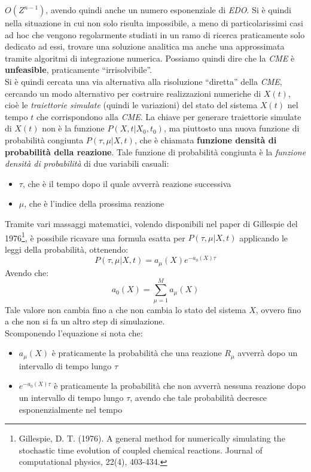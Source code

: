 \documentclass[a4paper,12pt, oneside]{book}
\begin{document}
$O(Z^{n-1})$, avendo quindi anche un numero esponenziale di \textit{EDO}. Si è
quindi nella situazione in cui non solo risulta impossibile, a meno di
particolarissimi casi ad hoc che vengono regolarmente studiati in un ramo di
ricerca praticamente solo dedicato ad essi, trovare una
soluzione analitica ma anche una approssimata tramite algoritmi di integrazione
numerica. Possiamo quindi dire che la \textit{CME} è \textbf{unfeasible},
praticamente ``irrisolvibile''.\\
Si è quindi cercata una via alternativa alla risoluzione ``diretta'' della
\textit{CME}, cercando un modo alternativo per costruire realizzazioni numeriche
di $X(t)$, cioè le \textit{traiettorie simulate} (quindi le variazioni) del
stato del sistema $X(t)$ nel tempo $t$ che corrispondono alla \textit{CME}. La
chiave per generare traiettorie simulate di $X(t)$ non è la funzione
$P(X,t|X_0,t_0)$, ma piuttosto una nuova funzione di probabilità congiunta
$P(\tau,\mu|X,t)$, che è chiamata \textbf{funzione densità di probabilità della
  reazione}. Tale funzione di probabilità congiunta è la \textit{funzione
  densità di probabilità} di due variabili casuali:
\begin{itemize}
  \item $\tau$, che è il tempo dopo il quale avverrà reazione successiva
  \item $\mu$, che è l'indice della prossima reazione
\end{itemize}
Tramite vari massaggi matematici, volendo disponibili nel paper di Gillespie del
1976\footnote{Gillespie, D. T. (1976). A general method for numerically
  simulating the stochastic time evolution of coupled chemical
  reactions. Journal of computational physics, 22(4), 403-434.}, è possibile
ricavare una formula esatta per $P(\tau,\mu|X,t)$ applicando le leggi della 
probabilità, ottenendo:
\[P(\tau,\mu|X,t)=a_\mu (X)e^{-a_0(X)\tau}\]
Avendo che:
\[a_0(X)=\sum_{\mu=1}^Ma_\mu(X)\]
Tale valore non cambia fino a che non cambia lo stato del sistema $X$, ovvero
fino a che non si fa un altro step di simulazione.\\
Scomponendo l'equazione si nota che:
\begin{itemize}
  \item $a_\mu (X)$ è praticamente la probabilità che una reazione $R_\mu$
  avverrà dopo un intervallo di tempo lungo $\tau$
  \item $e^{-a_0(X)\tau}$ è praticamente la probabilità che non avverrà nessuna
  reazione dopo un intervallo di tempo lungo $\tau$, avendo che tale
  probabilità decresce esponenzialmente nel tempo
\end{itemize}
\end{document}
